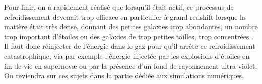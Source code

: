 Pour finir, on a rapidement réalisé que lorsqu'il était actif, ce processus de refroidissement devenait trop efficace en particulier à grand redshift lorsque la matière était très dense, donnant des petites galaxies trop abondantes, un nombre trop important d'étoiles ou des galaxies de trop petites tailles, trop concentrées . Il faut donc réinjecter de l'énergie dans le gaz pour qu'il arrête ce refroidissement catastrophique, via par exemple l'énergie injectée par les explosions d'étoiles en fin de vie en supernovæ ou par la présence d'un fond de rayonnement ultra-violet. On reviendra sur ces sujets dans la partie dédiée aux simulations numériques.
